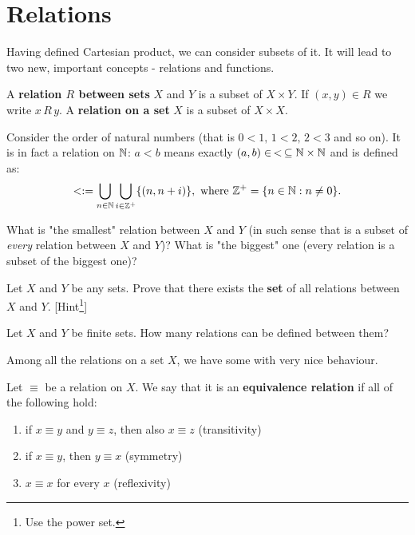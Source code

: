 \section{Relations}
Having defined Cartesian product, we can consider subsets of it. It will lead to two new, important concepts - relations and functions.

\begin{definition}
  A \textbf{relation $R$ between sets} $X$ and $Y$ is a subset of $X\times Y$. If $(x,y)\in R$ we write $x\,R\,y$. A \textbf{relation on a set} $X$ is a subset of $X\times X$.
\end{definition}

\begin{example}
  Consider the order of natural numbers (that is $0<1, \,1<2,\,2<3$ and so on). It is in fact a relation on $\mathbb N$: $a<b$ means exactly $(a,b)\in\, <\,\subseteq \mathbb N\times \mathbb N$ and is defined as:
  $$< := \bigcup_{n\in \mathbb N}\bigcup_{i\in \mathbb Z^+} \{(n, n+i)\}, \text{ where } \mathbb Z^+=\{n\in \mathbb N : n\neq 0\}.$$
\end{example}

\begin{exercise}
  What is "the smallest" relation between $X$ and $Y$ (in such sense that is a subset of \emph{every} relation between $X$ and $Y$)? What is "the biggest" one (every relation is a subset of the biggest one)?
\end{exercise}

\begin{exercise}
 Let $X$ and $Y$ be any sets. Prove that there exists the \textbf{set} of all relations between $X$ and $Y$. [Hint\footnote{Use the power set.}]
\end{exercise}

\begin{exercise}
  Let $X$ and $Y$ be finite sets. How many relations can be defined between them?
\end{exercise}

Among all the relations on a set $X$, we have some with very nice behaviour.

\begin{definition}
  Let $\equiv$ be a relation on $X$. We say that it is an \textbf{equivalence relation} if all of the following hold:
  \begin{enumerate}
    \item if $x\equiv y$ and $y\equiv z$, then also $x\equiv z$ (transitivity)
    \item if $x\equiv y$, then $y\equiv x$ (symmetry)
    \item $x\equiv x$ for every $x$ (reflexivity)
  \end{enumerate}
\end{definition}

